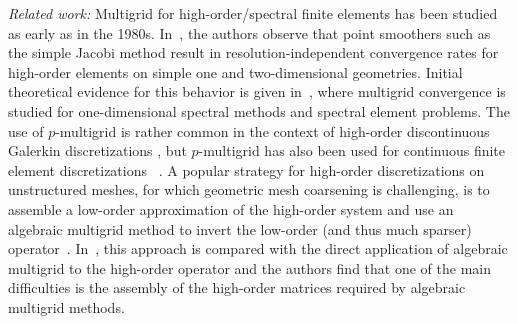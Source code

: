 \documentclass[times]{nlaauth}
\newcommand{\todo}[1]{\textcolor{red}{ #1}}
\newcommand{\gsnote}[1]{\textcolor{blue}{GS: #1}}
\begin{document}
{\em Related work:} Multigrid for high-order/spectral finite elements
has been studied as early as in the 1980s. In~\cite{RonquistPatera87},
the authors observe that point smoothers such as the simple Jacobi
method result in resolution-independent convergence rates for
high-order elements on simple one and two-dimensional
geometries. Initial theoretical evidence for this behavior is given
in~\cite{MadayMunoz88}, where multigrid convergence is studied for
one-dimensional spectral methods and spectral element problems.
%
The use of $p$-multigrid is rather common in the context of
high-order discontinuous Galerkin discretizations
\cite{FidkowskiOliverLuEtAl05, HelenbrookAtkins06}, but $p$-multigrid
has also been used for continuous finite element discretizations ~\cite{HelenbrookMavriplisAtkins03}.
%
%
%
%
A popular strategy for high-order discretizations on unstructured
meshes, for which geometric mesh coarsening is
challenging, is to assemble a low-order approximation of the
high-order system and use an algebraic multigrid method to invert the
low-order (and thus much sparser) operator~\cite{Brown10, Kim07,
  DevilleMund90, Olson07, CanutoGervasioQuarteroni10}.
In~\cite{HeysManteuffelMcCormickEtAl05}, this approach is compared
with the direct application of algebraic multigrid to the high-order
operator and the authors find that one of the main difficulties is the
assembly of the high-order matrices required by algebraic multigrid
methods.


\end{document}
